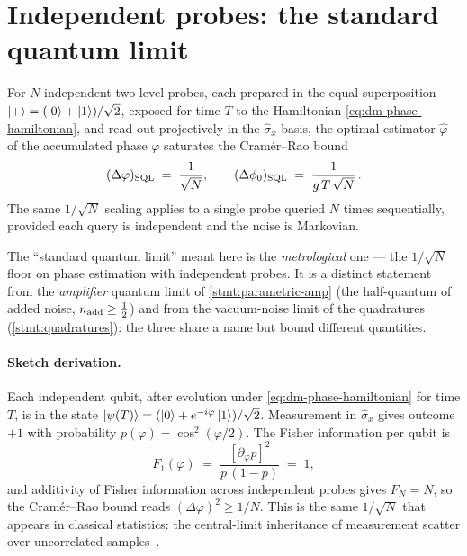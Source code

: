 \section{Independent probes: the standard quantum limit}
\label{sec:sql}

\begin{statement}
\label{stmt:sql}
For $N$ independent two-level probes, each prepared in the
equal superposition $\ket{+}=(\ket{0}+\ket{1})/\sqrt 2$,
exposed for time $T$ to the Hamiltonian
\cref{eq:dm-phase-hamiltonian}, and read out projectively in
the $\hat\sigma_x$ basis, the optimal estimator $\hat\varphi$
of the accumulated phase $\varphi$ saturates the
Cram\'{e}r--Rao bound
\begin{equation}
\label{eq:sql-bound}
(\Delta\varphi)_{\rm SQL} \;=\; \frac{1}{\sqrt{N}},
\qquad
(\Delta\phi_0)_{\rm SQL} \;=\; \frac{1}{g\,T\,\sqrt{N}}\,.
\end{equation}
The same $1/\sqrt{N}$ scaling applies to a single probe queried
$N$ times sequentially, provided each query is independent and
the noise is Markovian.
\end{statement}

\begin{note}
The ``standard quantum limit'' meant here is the \emph{metrological}
one --- the $1/\sqrt N$ floor on phase estimation with independent
probes. It is a distinct statement from the \emph{amplifier} quantum
limit of \cref{stmt:parametric-amp} (the half-quantum of added noise,
$n_{\rm add}\ge\tfrac12$) and from the vacuum-noise limit of the
quadratures (\cref{stmt:quadratures}): the three share a name but bound
different quantities.
\end{note}

\paragraph{Sketch derivation.}
Each independent qubit, after evolution under
\cref{eq:dm-phase-hamiltonian} for time $T$, is in the state
$\ket{\psi(T)}=(\ket{0}+e^{-i\varphi}\ket{1})/\sqrt 2$.
Measurement in $\hat\sigma_x$ gives outcome $+1$ with
probability $p(\varphi)=\cos^2(\varphi/2)$. The Fisher information
per qubit is~\cite{degen2017}
\begin{equation}
F_1(\varphi) \;=\; \frac{[\partial_\varphi p]^2}{p\,(1-p)} \;=\; 1,
\end{equation}
and additivity of Fisher information across independent probes
gives $F_N=N$, so the Cram\'{e}r--Rao bound reads
$(\Delta\varphi)^2 \geq 1/N$. This is the same $1/\sqrt N$
that appears in classical statistics: the central-limit
inheritance of measurement scatter over uncorrelated
samples~\cite{caves1981,wineland1992}.

